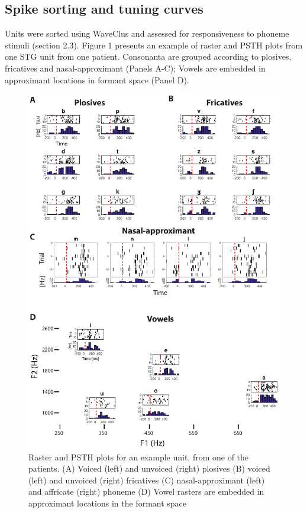 \subsection{Spike sorting and tuning curves}
Units were sorted using WaveClus and assessed for responsiveness to phoneme stimuli (section 2.3). Figure 1 presents an example of raster and PSTH plots from one STG unit from one patient. Consonanta are grouped according to plosives, fricatives and nasal-approximant (Panels A-C); Vowels are embedded in approximant locations in formant space (Panel D).

\begin{figure}[H]
\vspace{.3in}
\includegraphics[width=\linewidth]{Figures/Ch3/Figure2_new.eps}
\caption{Raster and PSTH plots for an example unit, from one of the patients. (A) Voiced (left) and unvoiced (right) plosives (B) voiced (left) and unvoiced (right) fricatives (C)  nasal-approximant (left) and affricate (right) phoneme (D) Vowel rasters are embedded in approximant locations in the formant space}
\end{figure}

